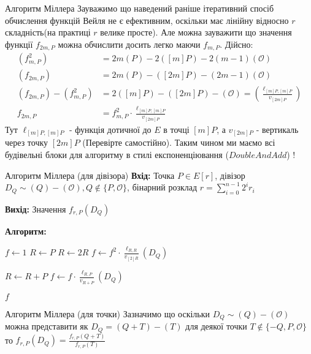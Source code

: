\documentclass[9pt]{beamer}
\begin{document}
\begin{darkframes}
\begin{frame}{Алгоритм Міллера}
    Зауважимо що наведений раніше ітеративний спосіб обчислення функцій Вейля не є ефективним, оскільки має лінійну відносно $r$ складність(на практиці $r$ велике просте). Але можна зауважити що значення функції $f_{2m, P}$ можна обчислити досить легко маючи $f_{m,P}$. Дійсно:
    \begin{align*}
        (f^2_{m,P}) &= 2m(P)-2([m]P)-2(m-1)(\mathcal{O}) \\
        (f_{2m,P})&= 2m(P)-([2m]P)-(2m-1)(\mathcal{O}) \\
        (f_{2m,P})-(f^2_{m,P})&=2([m]P)-([2m]P)-(\mathcal{O})=(\frac{\ell_{[m]P,[m]P}}{v_{[2m]P}}) \\
        f_{2m,P}&=f^2_{m,P} \cdot \frac{\ell_{[m]P,[m]P}}{v_{[2m]P}}
    \end{align*}
Тут $\ell_{[m]P,[m]P}$ - функція дотичної до $E$ в точці $[m]P$, а $v_{[2m]P}$ - вертикаль через точку $[2m]P$ (Перевірте самостійно).
Таким чином ми маємо всі будівельні блоки для алгоритму в стилі експоненціювання ($DoubleAndAdd$) !
\end{frame}

\begin{frame}{Алгоритм Міллера (для дівізора)}
\textbf{Вхід:} Точка $P\in E[r]$, дівізор $D_Q \sim (Q)-(\mathcal{O}), Q \notin \{P,\mathcal{O}\}$, бінарний розклад $r=\sum_{i=0}^{n-1} 2^i r_i$

\textbf{Вихід:} Значення \(f_{r,P}(D_Q)\)

\textbf{Алгоритм:}
\begin{algorithmic}[1]
  \State \(f \gets 1\)
  \State \(R \gets P\)
    \State \(R \gets 2R\)
    \State \(f \gets f^2 \cdot \frac{\ell_{R, R}}{v_{[2]R}}(D_Q)\) 
    
    \State \(R \gets R + P\)
      \State \(f \gets f \cdot \frac{\ell_{R, P}}{v_{R+P}}(D_Q)\) 
      
    \EndIf
  \EndFor
  \State \Return \(f\)
\end{algorithmic}

\end{frame}

\begin{frame}{Алгоритм Міллера (для точки)}
    Зазначимо що оскільки $D_Q\sim (Q)-(\mathcal{O})$ можна представити як $D_Q=(Q+T)-(T)$ для деякої точки $T\notin \{-Q,P,\mathcal{O}\}$ то $f_{r,P}(D_Q)=\frac{f_{r,P}(Q+T)}{f_{r,P}(T)}$


\end{frame}
\end{darkframes}
\end{document}

